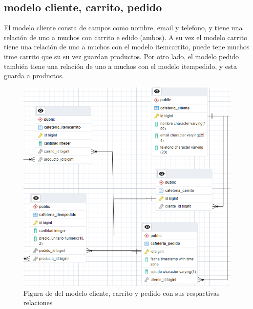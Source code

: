 \documentclass{article}
\begin{document}
	\subsection{modelo cliente, carrito, pedido}
	El modelo cliente consta de campos como nombre, email y telefono, y tiene  una relación de uno a muchos con carrito e edido (ambos). A su vez el modelo carrito tiene una relación de uno a muchos con el modelo itemcarrito, puede tene muchos itme carrito que su su vez guardan productos. Por otro lado, el modelo pedido también tiene una relación de uno a muchos con el modelo itempedido, y esta guarda a productos.
	\begin{figure}[h!]
		\centering
		\includegraphics[width=1\linewidth]{img/modClienteotros}
		\caption{Figura de del modelo cliente, carrito y pedido con sus respactivas relaciones}
		\label{fig:modclienteotros}
	\end{figure}
	\newpage
\end{document}
